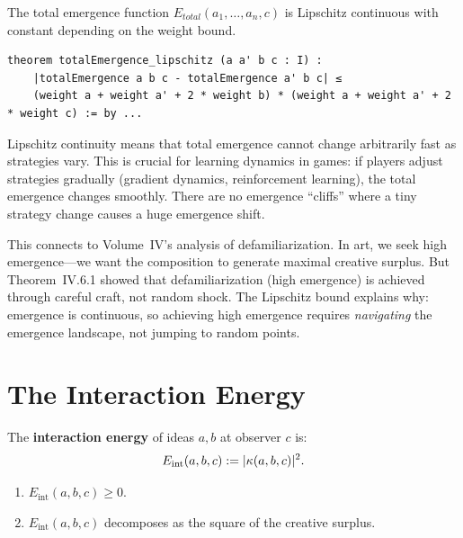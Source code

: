 \begin{theorem}
\label{thm:total-emergence-lipschitz}
The total emergence function $E_{total}(a_1, \ldots, a_n, c)$ is Lipschitz
continuous with constant depending on the weight bound.
\end{theorem}

\begin{lstlisting}[caption={Total emergence Lipschitz bound (IDT\_v3\_Emergence.lean)}]
theorem totalEmergence_lipschitz (a a' b c : I) :
    |totalEmergence a b c - totalEmergence a' b c| ≤
    (weight a + weight a' + 2 * weight b) * (weight a + weight a' + 2 * weight c) := by ...
\end{lstlisting}

\begin{interpretation}
Lipschitz continuity means that total emergence cannot change arbitrarily fast
as strategies vary. This is crucial for learning dynamics in games: if players
adjust strategies gradually (gradient dynamics, reinforcement learning), the
total emergence changes smoothly. There are no emergence ``cliffs'' where a
tiny strategy change causes a huge emergence shift.

This connects to Volume~IV's analysis of defamiliarization. In art, we seek
high emergence---we want the composition to generate maximal creative surplus.
But Theorem~IV.6.1 showed that defamiliarization (high emergence) is achieved
through careful craft, not random shock. The Lipschitz bound explains why:
emergence is continuous, so achieving high emergence requires \emph{navigating}
the emergence landscape, not jumping to random points.
\end{interpretation}


\section{The Interaction Energy}

\begin{definition}
\label{def:interaction-energy}
The \textbf{interaction energy} of ideas $a, b$ at observer $c$ is:
\[
  E_{\text{int}}(a, b, c) := |\kappa(a, b, c)|^2.
\]
\end{definition}

\begin{theorem}
\label{thm:interaction-energy}
\begin{enumerate}
  \item $E_{\text{int}}(a, b, c) \geq 0$.
  \item $E_{\text{int}}(a, b, c)$ decomposes as the square of the creative surplus.
\end{enumerate}
\end{theorem}

